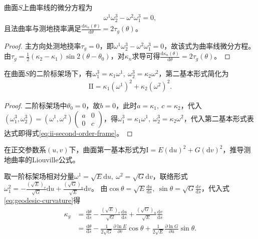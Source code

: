 \documentclass[../../main.tex]{subfiles}%
\begin{document}
\begin{proposition}
曲面$S$上曲率线的微分方程为
\begin{align}
\omega^1\omega_2^3-\omega^2\omega_1^3=0,\label{eq:curvature-line-eq}
\end{align}
且法曲率与测地挠率满足$\frac{\mathrm{d}\kappa_n(\theta)}{\mathrm{d}\theta}=2\tau_g(\theta)$。
\end{proposition}

\begin{proof}
主方向处测地挠率$\tau_g=0$，即$\omega^1\omega_2^3-\omega^2\omega_1^3=0$，故该式为曲率线微分方程。
由$\tau_g=\frac{1}{2}(\kappa_2-\kappa_1)\sin2(\theta-\theta_0)$，对$\kappa_n$求导可得$\frac{\mathrm{d}\kappa_n(\theta)}{\mathrm{d}\theta}=2\tau_g(\theta)$。
\end{proof}

\begin{proposition}
在曲面$S$的二阶标架场下，有$\omega_1^3=\kappa_1\omega^1,\ \omega_2^3=\kappa_2\omega^2$，第二基本形式简化为
\begin{align}
\mathrm{II}=\kappa_1(\omega^1)^2+\kappa_2(\omega^2)^2.\label{eq:ii-second-order-frame}
\end{align}
\end{proposition}

\begin{proof}
二阶标架场中$\theta_0=0$，故$b=0$，此时$a=\kappa_1,\ c=\kappa_2$，代入$(\omega_1^3,\omega_2^3)=(\omega^1,\omega^2)\begin{pmatrix}a&0\\0&c\end{pmatrix}$，得$\omega_1^3=\kappa_1\omega^1,\ \omega_2^3=\kappa_2\omega^2$，代入第二基本形式表达式即得式\eqref{eq:ii-second-order-frame}。
\end{proof}

\begin{example}
在正交参数系$(u,v)$下，曲面第一基本形式为$\mathrm{I}=E(\mathrm{d}u)^2+G(\mathrm{d}v)^2$，推导测地曲率的Liouville公式。
\end{example}
\begin{solution}
取一阶标架场相对分量$\omega^1=\sqrt{E}\mathrm{d}u,\ \omega^2=\sqrt{G}\mathrm{d}v$，联络形式$\omega_1^2=-\frac{(\sqrt{E})_v}{\sqrt{G}}\mathrm{d}u+\frac{(\sqrt{G})_u}{\sqrt{E}}\mathrm{d}v$。
由$\cos\theta=\sqrt{E}\frac{\mathrm{d}u}{\mathrm{d}s},\ \sin\theta=\sqrt{G}\frac{\mathrm{d}v}{\mathrm{d}s}$，代入式\eqref{eq:geodesic-curvature}得
\begin{align*}
\kappa_g&=\frac{\mathrm{d}\theta}{\mathrm{d}s}-\frac{(\sqrt{E})_v}{\sqrt{G}}\frac{\mathrm{d}u}{\mathrm{d}s}+\frac{(\sqrt{G})_u}{\sqrt{E}}\frac{\mathrm{d}v}{\mathrm{d}s}\\
&=\frac{\mathrm{d}\theta}{\mathrm{d}s}-\frac{1}{2\sqrt{G}}\frac{\partial\ln E}{\partial v}\cos\theta+\frac{1}{2\sqrt{E}}\frac{\partial\ln G}{\partial u}\sin\theta.
\end{align*}

\end{solution}
\end{document}
